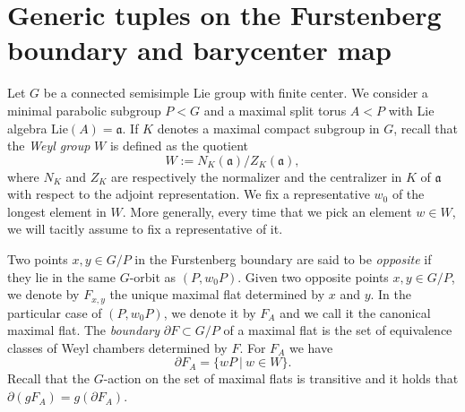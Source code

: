 \documentclass[a4paper]{amsart}
\theoremstyle{definition}
\theoremstyle{remark}
\theoremstyle{TheoremNum}
\begin{document}

\section{Generic tuples on the Furstenberg boundary and barycenter map}\label{sec barycenter}

Let $G$ be a connected semisimple Lie group with finite center. We consider a minimal parabolic subgroup $P<G$ and a maximal split torus $A<P$ with Lie algebra $\mathrm{Lie}(A)=\mathfrak{a}$. If $K$ denotes a maximal compact subgroup in $G$, recall that the \emph{Weyl group} $W$ is defined as the quotient 
$$
W:=N_K(\mathfrak{a})/Z_K(\mathfrak{a}),
$$
where $N_K$ and $Z_K$ are respectively the normalizer and the centralizer in $K$ of $\mathfrak{a}$ with respect to the adjoint representation. We fix a representative $w_0$ of the longest element in $W$. More generally, every time that we pick an element $w \in W$, we will tacitly assume to fix a representative of it. 

Two points $x,y \in G/P$ in the Furstenberg boundary are said to be \emph{opposite} if they lie in the same $G$-orbit as $(P,w_0P)$. Given two opposite points $x,y \in G/P$, we denote by $F_{x,y}$ the unique maximal flat determined by $x$ and $y$. In the particular case of $(P,w_0P)$, we denote it by $F_A$ and we call it the canonical maximal flat. The \emph{boundary} $\partial F \subset G/P$ of a maximal flat is the set of equivalence classes of Weyl chambers determined by $F$. For $F_A$ we have
$$
\partial F_A = \{ wP \ | \ w \in W\}.
$$
Recall that the $G$-action on the set of maximal flats is transitive and it holds that $\partial(gF_A)=g(\partial F_A)$. 
\end{document}
